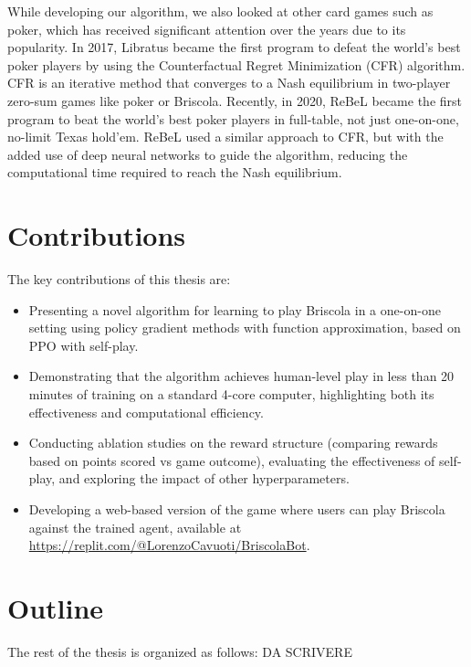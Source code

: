 While developing our algorithm, we also looked at other card games such as poker, which has received significant attention over the years due to its popularity. In 2017, Libratus \cite{libratus} became the first program to defeat the world's best poker players by using the Counterfactual Regret Minimization (CFR) \cite{cfr} algorithm. CFR is an iterative method that converges to a Nash equilibrium in two-player zero-sum games like poker or Briscola. Recently, in 2020, ReBeL \cite{rebel} became the first program to beat the world's best poker players in full-table, not just one-on-one, no-limit Texas hold'em. ReBeL used a similar approach to CFR, but with the added use of deep neural networks to guide the algorithm, reducing the computational time required to reach the Nash equilibrium.

\section{Contributions}
The key contributions of this thesis are:
\begin{itemize}
    \item Presenting a novel algorithm for learning to play Briscola in a one-on-one setting using policy gradient methods with function approximation, based on PPO with self-play.
    \item Demonstrating that the algorithm achieves human-level play in less than 20 minutes of training on a standard 4-core computer, highlighting both its effectiveness and computational efficiency.
    \item Conducting ablation studies on the reward structure (comparing rewards based on points scored vs game outcome), evaluating the effectiveness of self-play, and exploring the impact of other hyperparameters.
    \item Developing a web-based version of the game where users can play Briscola against the trained agent, available at \url{https://replit.com/@LorenzoCavuoti/BriscolaBot}.
\end{itemize}

\section{Outline}
The rest of the thesis is organized as follows:
DA SCRIVERE